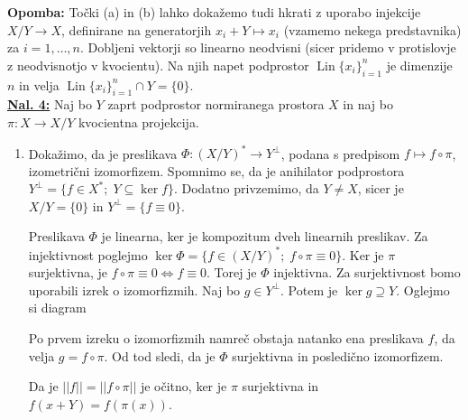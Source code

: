 \documentclass[a4paper, 12pt]{article}
\DeclareMathOperator{\Lin}{Lin}
\newcommand{\R}{\mathbb{R}}
\newcommand{\F}{\mathbb{F}}
\begin{document}
\textbf{Opomba:} Točki (a) in (b) lahko dokažemo tudi hkrati z uporabo injekcije $X/Y \to X$, definirane na generatorjih $x_i + Y \mapsto x_i$ (vzamemo nekega predstavnika) za $i = 1,\dots, n$. Dobljeni vektorji so linearno neodvisni (sicer pridemo v protislovje z neodvisnotjo v kvocientu). Na njih napet podprostor $\Lin\lbrace x_i\rbrace_{i=1}^n$ je dimenzije $n$ in velja $\Lin\lbrace x_i\rbrace_{i=1}^n \cap Y = \lbrace 0 \rbrace$.\\
\newline
\underline{\textbf{Nal. 4:}}
Naj bo $Y$ zaprt podprostor normiranega prostora $X$ in naj bo $\pi\colon X \to X/Y$ kvocientna projekcija.
\begin{enumerate}[label=(\alph*)]
	\item Dokažimo, da je preslikava $\Phi\colon (X/Y)^* \to Y^\bot$, podana s predpisom $f \mapsto f \circ \pi$, izometrični izomorfizem.
	Spomnimo se, da je anihilator podprostora $Y^\bot = \lbrace f \in X^* ; \; Y \subseteq \ker f \rbrace$.
	Dodatno privzemimo, da $Y \neq X$, sicer je $X/Y = \lbrace 0 \rbrace$ in $Y^\bot = \lbrace f \equiv 0 \rbrace$.
	
	Preslikava $\Phi$ je linearna, ker je kompozitum dveh linearnih preslikav. Za injektivnost poglejmo $\ker\Phi = \lbrace f \in (X/Y)^* ; \; f \circ \pi \equiv 0\rbrace$. Ker je $\pi$ surjektivna, je $f \circ \pi \equiv 0 \iff f \equiv 0$. Torej je $\Phi$ injektivna. Za surjektivnost bomo uporabili izrek o izomorfizmih. Naj bo $g \in Y^\bot$. Potem je $\ker g \supseteq Y$. Oglejmo si diagram
	
	\adjustbox{scale=1, center}{
		\begin{tikzcd}
			X \arrow[d, "\pi"] \arrow[r, "g"] & \F \\
			\R \arrow[ru, "f"] &
		\end{tikzcd}
	}
	Po prvem izreku o izomorfizmih namreč obstaja natanko ena preslikava $f$, da velja $g = f \circ \pi$.
	Od tod sledi, da je $\Phi$ surjektivna in posledično izomorfizem.
	
	Da je $||f|| = ||f\circ\pi||$ je očitno, ker je $\pi$ surjektivna in $f(x + Y) = f(\pi(x))$.
	

\end{enumerate}
\end{document}
